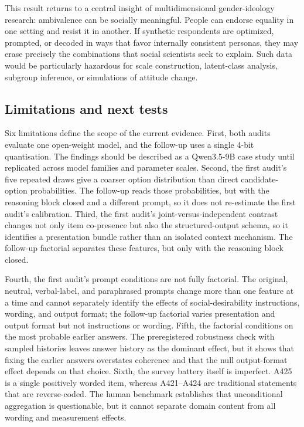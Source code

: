 \documentclass[11pt]{article}
\begin{document}
This result returns to a central insight of multidimensional gender-ideology research: ambivalence can be socially meaningful. People can endorse equality in one setting and resist it in another. If synthetic respondents are optimized, prompted, or decoded in ways that favor internally consistent personas, they may erase precisely the combinations that social scientists seek to explain. Such data would be particularly hazardous for scale construction, latent-class analysis, subgroup inference, or simulations of attitude change.

\subsection{Limitations and next tests}

Six limitations define the scope of the current evidence. First, both audits evaluate one open-weight model, and the follow-up uses a single 4-bit quantisation. The findings should be described as a Qwen3.5-9B case study until replicated across model families and parameter scales. Second, the first audit's five repeated draws give a coarser option distribution than direct candidate-option probabilities. The follow-up reads those probabilities, but with the reasoning block closed and a different prompt, so it does not re-estimate the first audit's calibration. Third, the first audit's joint-versus-independent contrast changes not only item co-presence but also the structured-output schema, so it identifies a presentation bundle rather than an isolated context mechanism. The follow-up factorial separates these features, but only with the reasoning block closed.

Fourth, the first audit's prompt conditions are not fully factorial. The original, neutral, verbal-label, and paraphrased prompts change more than one feature at a time and cannot separately identify the effects of social-desirability instructions, wording, and output format; the follow-up factorial varies presentation and output format but not instructions or wording. Fifth, the factorial conditions on the most probable earlier answers. The preregistered robustness check with sampled histories leaves answer history as the dominant effect, but it shows that fixing the earlier answers overstates coherence and that the null output-format effect depends on that choice. Sixth, the survey battery itself is imperfect. A425 is a single positively worded item, whereas A421--A424 are traditional statements that are reverse-coded. The human benchmark establishes that unconditional aggregation is questionable, but it cannot separate domain content from all wording and measurement effects.
\end{document}
